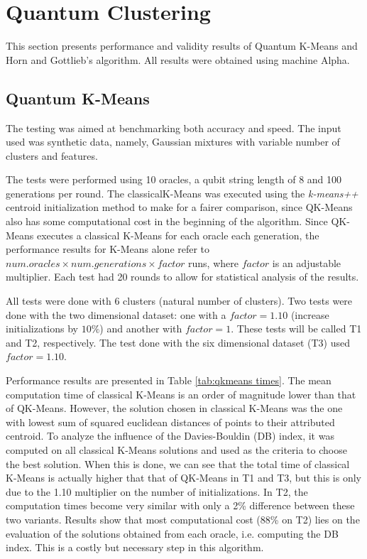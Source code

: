 
\section{Quantum Clustering}

This section presents performance and validity results of Quantum K-Means and Horn and Gottlieb's algorithm.
All results were obtained using machine Alpha.

\subsection{Quantum K-Means}

The testing was aimed at benchmarking both accuracy and speed.
The input used was synthetic data, namely, Gaussian mixtures with variable number of clusters and features.

The tests were performed using 10 oracles, a qubit string length of 8 and 100 generations per round.
The classicalK-Means was executed using the \emph{k-means++} centroid initialization method to make for a fairer comparison, since QK-Means also has some computational cost in the beginning of the algorithm.
Since QK-Means executes a classical K-Means for each oracle each generation, the performance results for K-Means alone refer to $num.oracles \times num.generations \times factor$ runs, where $factor$ is an adjustable multiplier.
Each test had 20 rounds to allow for statistical analysis of the results.

All tests were done with 6 clusters (natural number of clusters).
Two tests were done with the two dimensional dataset: one with a $factor=1.10$ (increase initializations by $10\%$) and another with $factor=1$.
These tests will be called T1 and T2, respectively.
The test done with the six dimensional dataset (T3) used $factor=1.10$.

Performance results are presented in Table \ref{tab:qkmeans times}.
The mean computation time of classical K-Means is an order of magnitude lower than that of QK-Means.
However, the solution chosen in classical K-Means was the one with lowest sum of squared euclidean distances of points to their attributed centroid.
To analyze the influence of the Davies-Bouldin (DB) index, it was computed on all classical K-Means solutions and used as the criteria to choose the best solution.
When this is done, we can see that the total time of classical K-Means is actually higher that that of QK-Means in T1 and T3, but this is only due to the 1.10 multiplier on the number of initializations.
In T2, the computation times become very similar with only a 2\% difference between these two variants.
Results show that most computational cost (88\% on T2) lies on the evaluation of the solutions obtained from each oracle, i.e. computing the DB index.
This is a costly but necessary step in this algorithm.

